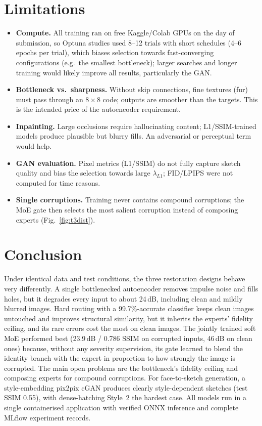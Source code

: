 \documentclass[conference]{IEEEtran}
\begin{document}
\section{Limitations}\label{sec:limits}
\begin{itemize}
\item \textbf{Compute.} All training ran on free Kaggle/Colab GPUs on the day of submission, so Optuna studies used 8--12 trials with short schedules (4--6 epochs per trial), which biases selection towards fast-converging configurations (e.g.\ the smallest bottleneck); larger searches and longer training would likely improve all results, particularly the GAN.
\item \textbf{Bottleneck vs.\ sharpness.} Without skip connections, fine textures (fur) must pass through an $8{\times}8$ code; outputs are smoother than the targets. This is the intended price of the autoencoder requirement.
\item \textbf{Inpainting.} Large occlusions require hallucinating content; L1/SSIM-trained models produce plausible but blurry fills. An adversarial or perceptual term would help.
\item \textbf{GAN evaluation.} Pixel metrics (L1/SSIM) do not fully capture sketch quality and bias the selection towards large $\lambda_{L1}$; FID/LPIPS were not computed for time reasons.
\item \textbf{Single corruptions.} Training never contains compound corruptions; the MoE gate then selects the most salient corruption instead of composing experts (Fig.~\ref{fig:t3dist}).
\end{itemize}

\section{Conclusion}
Under identical data and test conditions, the three restoration designs behave very differently. A single bottlenecked autoencoder removes impulse noise and fills holes, but it degrades every input to about 24\,dB, including clean and mildly blurred images. Hard routing with a 99.7\%-accurate classifier keeps clean images untouched and improves structural similarity, but it inherits the experts' fidelity ceiling, and its rare errors cost the most on clean images. The jointly trained soft MoE performed best (23.9\,dB / 0.786 SSIM on corrupted inputs, 46\,dB on clean ones) because, without any severity supervision, its gate learned to blend the identity branch with the expert in proportion to how strongly the image is corrupted. The main open problems are the bottleneck's fidelity ceiling and composing experts for compound corruptions. For face-to-sketch generation, a style-embedding pix2pix cGAN produces clearly style-dependent sketches (test SSIM 0.55), with dense-hatching Style~2 the hardest case. All models run in a single containerised application with verified ONNX inference and complete MLflow experiment records.
\end{document}
